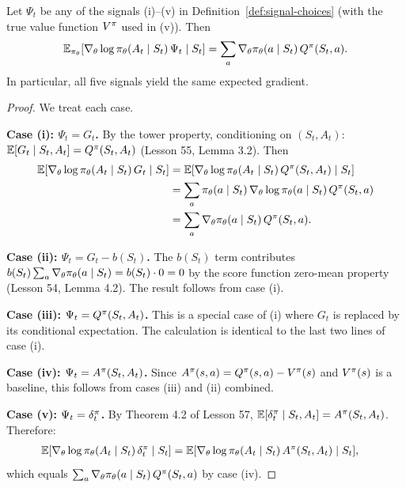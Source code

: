 \documentclass[11pt,a4paper]{article}
\begin{document}
\begin{theorem}
\label{thm:unbiased-signals}
Let $\Psi_t$ be any of the signals (i)--(v) in
Definition~\ref{def:signal-choices} (with the true value function
$V^{\pi}$ used in (v)). Then
\[
  \mathbb{E}_{\pi_\theta}\!\left[\nabla_\theta \log
  \pi_\theta(A_t \mid S_t)\, \Psi_t \;\middle|\; S_t\right]
  = \sum_a \nabla_\theta \pi_\theta(a \mid S_t)\, Q^{\pi}(S_t, a).
\]
In particular, all five signals yield the same expected gradient.
\end{theorem}

\begin{proof}
We treat each case.

\textbf{Case (i): $\Psi_t = G_t$.} By the tower property, conditioning
on $(S_t, A_t)$: $\mathbb{E}[G_t \mid S_t, A_t] = Q^{\pi}(S_t, A_t)$ (Lesson 55,
Lemma 3.2). Then
\begin{align*}
  \mathbb{E}[\nabla_\theta \log \pi_\theta(A_t \mid S_t)\, G_t \mid S_t]
  &= \mathbb{E}[\nabla_\theta \log \pi_\theta(A_t \mid S_t)\,
     Q^{\pi}(S_t, A_t) \mid S_t] \\
  &= \sum_a \pi_\theta(a \mid S_t)\, \nabla_\theta \log
     \pi_\theta(a \mid S_t)\, Q^{\pi}(S_t, a) \\
  &= \sum_a \nabla_\theta \pi_\theta(a \mid S_t)\, Q^{\pi}(S_t, a).
\end{align*}

\textbf{Case (ii): $\Psi_t = G_t - b(S_t)$.} The $b(S_t)$ term
contributes $b(S_t) \sum_a \nabla_\theta \pi_\theta(a \mid S_t)
= b(S_t) \cdot 0 = 0$ by the score function zero-mean property
(Lesson 54, Lemma 4.2). The result follows from case (i).

\textbf{Case (iii): $\Psi_t = Q^{\pi}(S_t, A_t)$.} This is a special
case of (i) where $G_t$ is replaced by its conditional expectation.
The calculation is identical to the last two lines of case (i).

\textbf{Case (iv): $\Psi_t = A^\pi(S_t, A_t)$.} Since
$A^\pi(s,a) = Q^{\pi}(s,a) - V^{\pi}(s)$ and $V^{\pi}(s)$ is a baseline,
this follows from cases (iii) and (ii) combined.

\textbf{Case (v): $\Psi_t = \delta_t^\pi$.} By Theorem 4.2 of
Lesson 57, $\mathbb{E}[\delta_t^\pi \mid S_t, A_t] = A^\pi(S_t, A_t)$.
Therefore:
\begin{align*}
  \mathbb{E}[\nabla_\theta \log \pi_\theta(A_t \mid S_t)\, \delta_t^\pi
  \mid S_t]
  &= \mathbb{E}[\nabla_\theta \log \pi_\theta(A_t \mid S_t)\,
     A^\pi(S_t, A_t) \mid S_t],
\end{align*}
which equals $\sum_a \nabla_\theta \pi_\theta(a \mid S_t)\,
Q^{\pi}(S_t, a)$ by case (iv).
\end{proof}
\end{document}
